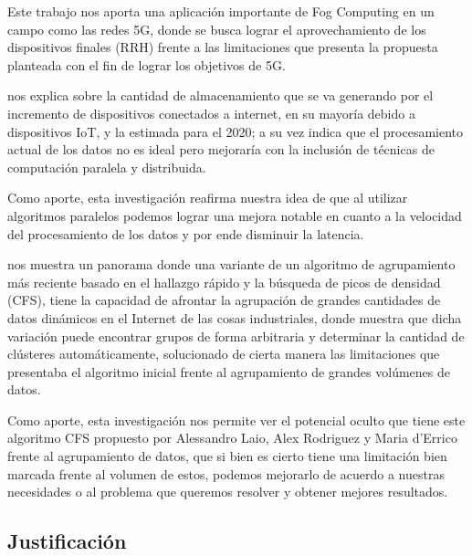         Este trabajo nos aporta una aplicación importante de Fog Computing en un campo como las redes 5G, donde se busca lograr el aprovechamiento de los dispositivos finales (RRH) frente a las limitaciones que presenta la propuesta planteada con el fin de lograr los objetivos de 5G.\par     
        \vskip 0.3cm
        {\bf\cite{piccialli2018}} nos explica sobre la cantidad de almacenamiento que se va generando por el incremento de dispositivos conectados a internet, en su mayoría debido a dispositivos IoT, y la estimada para el 2020; a su vez indica que el procesamiento actual de los datos no es ideal pero mejoraría con la inclusión de técnicas de computación paralela y distribuida.\par
        Como aporte, esta investigación reafirma nuestra idea de que al utilizar algoritmos paralelos podemos lograr una mejora notable en cuanto a la velocidad del procesamiento de los datos y por ende disminuir la latencia. \par
        \vskip 0.3cm
        {\bf\cite{shanmugapriya2018}} nos muestra un panorama donde una variante de un algoritmo de agrupamiento más reciente basado en el hallazgo rápido y la búsqueda de picos de densidad (CFS), tiene la capacidad de afrontar la agrupación de grandes cantidades de datos dinámicos en el Internet de las cosas industriales, donde muestra que dicha variación puede encontrar grupos de forma arbitraria y determinar la cantidad de clústeres automáticamente, solucionado de cierta manera las limitaciones que presentaba el algoritmo inicial frente al agrupamiento de grandes volúmenes de datos.\par
        Como aporte, esta investigación nos permite ver el potencial oculto que tiene este algoritmo CFS propuesto por Alessandro Laio, Alex Rodriguez y Maria d’Errico frente al agrupamiento de datos, que si bien es cierto tiene una limitación bien marcada frente al volumen de estos, podemos mejorarlo de acuerdo a nuestras necesidades o al problema que queremos resolver y obtener mejores resultados.\par

    \subsection{Justificación}
